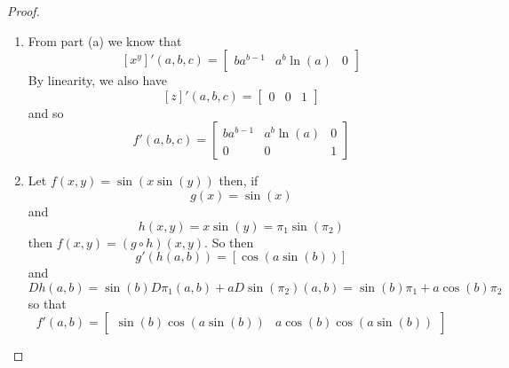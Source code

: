 \begin{enumerate}
\begin{proof}
\begin{enumerate}
        \item From part (a) we know that 
        \[
        \left[x^y\right]'(a,b,c) = \left[ \begin{array}{ccc} ba^{b-1} & a^{b}\ln(a) & 0 \end{array} \right]
        \]
        By linearity, we also have
        \[
        \left[ z \right]' (a,b,c) = \left[ \begin{array}{ccc} 0 & 0 & 1  \end{array} \right]
        \]
        and so
        \[
        f'(a,b,c) = \left[ \begin{array}{ccc} ba^{b-1} & a^{b}\ln(a) & 0 \\ 0 & 0 & 1 \end{array}\right]
        \]
        
        \item Let \( f(x,y) = \sin( x \sin(y)) \) then, if 
        \[
        g(x) = \sin(x)
        \]
        and
        \[
        h(x,y) = x\sin(y) = \pi_1 \sin(\pi_2)
        \]
        then \( f(x,y) = (g \circ h) (x,y) \). So then 
        \[
        g'(h(a,b)) = \left[ \cos(a\sin(b)) \right]
        \]
        and
        \[
        Dh(a,b) = \sin(b)D\pi_1(a,b) + a D\sin(\pi_2)(a,b) = \sin(b)\pi_1 + a\cos(b)\pi_2
        \]
        so that
        \[
        f'(a,b) = \left[ \begin{array}{cc} \sin(b)\cos(a\sin(b)) & a\cos(b)\cos(a\sin(b)) \end{array} \right]
        \]
        

\end{enumerate}
\end{proof}
\end{enumerate}
